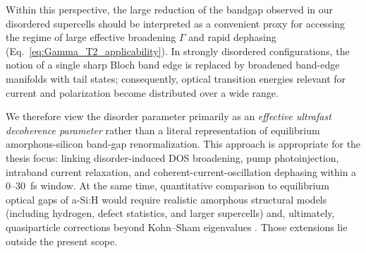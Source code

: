 Within this perspective, the large reduction of the bandgap observed in our disordered supercells should be interpreted as a convenient proxy for accessing the regime of large effective broadening $\Gamma$ and rapid dephasing (Eq.~\ref{eq:Gamma_T2_applicability}). In strongly disordered configurations, the notion of a single sharp Bloch band edge is replaced by broadened band-edge manifolds with tail states; consequently, optical transition energies relevant for current and polarization become distributed over a wide range.

We therefore view the disorder parameter primarily as an \emph{effective ultrafast decoherence parameter} rather than a literal representation of equilibrium amorphous-silicon band-gap renormalization. This approach is appropriate for the thesis focus: linking disorder-induced DOS broadening, pump photoinjection, intraband current relaxation, and coherent-current-oscillation dephasing within a $0$--$30$~fs window. At the same time, quantitative comparison to equilibrium optical gaps of a-Si:H would require realistic amorphous structural models (including hydrogen, defect statistics, and larger supercells) and, ultimately, quasiparticle corrections beyond Kohn--Sham eigenvalues \cite{Onida2002ElectronicExcitations}. Those extensions lie outside the present scope.